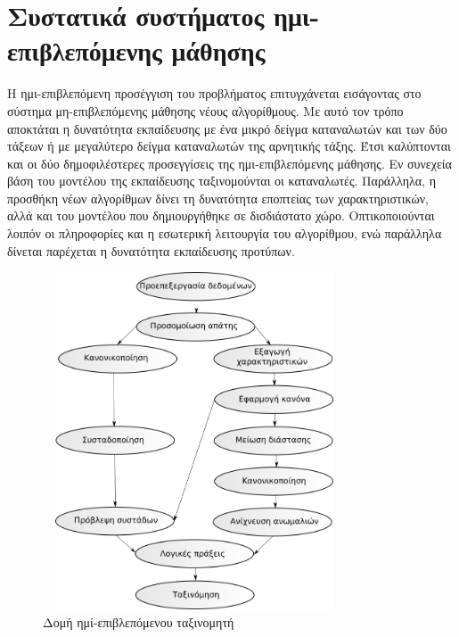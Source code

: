\section{Συστατικά συστήματος ημι-επιβλεπόμενης μάθησης}
Η ημι-επιβλεπόμενη προσέγγιση του προβλήματος επιτυγχάνεται εισάγοντας στο σύστημα μη-επιβλεπόμενης μάθησης νέους αλγορίθμους. Με αυτό τον τρόπο αποκτάται η δυνατότητα εκπαίδευσης με ένα μικρό δείγμα καταναλωτών και των δύο τάξεων ή με μεγαλύτερο δείγμα καταναλωτών της αρνητικής τάξης. Έτσι καλύπτονται και οι δύο δημοφιλέστερες προσεγγίσεις της ημι-επιβλεπόμενης μάθησης. Εν συνεχεία βάση του μοντέλου της εκπαίδευσης ταξινομούνται οι καταναλωτές. Παράλληλα, η προσθήκη νέων αλγορίθμων δίνει τη δυνατότητα εποπτείας των χαρακτηριστικών, αλλά και του μοντέλου που δημιουργήθηκε σε δισδιάστατο χώρο. Οπτικοποιούνται λοιπόν οι πληροφορίες και η εσωτερική λειτουργία του αλγορίθμου, ενώ παράλληλα δίνεται παρέχεται η δυνατότητα εκπαίδευσης προτύπων.\par
\begin{figure}[ht!]
\centering
 \includegraphics[width=90mm, height=100mm]{../../plots/systems/semi_supervised.png}
 \caption{Δομή ημί-επιβλεπόμενου ταξινομητή}
\label{fig:semisupervisedsystem}
 \end{figure}

